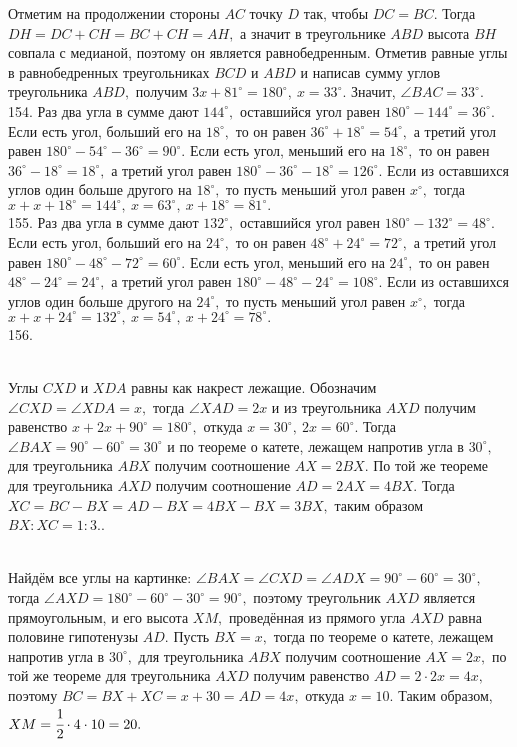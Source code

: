 Отметим на продолжении стороны $AC$ точку $D$ так, чтобы $DC=BC.$ Тогда $DH=DC+CH=BC+CH=AH,$ а значит в треугольнике $ABD$ высота $BH$ совпала с медианой, поэтому он является равнобедренным. Отметив равные углы в равнобедренных треугольниках $BCD$ и $ABD$ и написав сумму углов треугольника $ABD,$ получим $3x+81^\circ=180^\circ,\ x=33^\circ.$ Значит, $\angle BAC=33^\circ.$\\
154. Раз два угла в сумме дают $144^\circ,$ оставшийся угол равен $180^\circ-144^\circ=36^\circ.$ Если есть угол, больший его на $18^\circ,$ то он равен $36^\circ+18^\circ=54^\circ,$ а третий угол равен $180^\circ-54^\circ-36^\circ=90^\circ.$ Если есть угол, меньший его на $18^\circ,$ то он равен $36^\circ-18^\circ=18^\circ,$ а третий угол равен
$180^\circ-36^\circ-18^\circ=126^\circ.$ Если из оставшихся углов один больше другого на $18^\circ,$ то пусть меньший угол равен $x^\circ,$ тогда
$x+x+18^\circ=144^\circ,\ x=63^\circ,\ x+18^\circ=81^\circ.$\\
155. Раз два угла в сумме дают $132^\circ,$ оставшийся угол равен $180^\circ-132^\circ=48^\circ.$ Если есть угол, больший его на $24^\circ,$ то он равен $48^\circ+24^\circ=72^\circ,$ а третий угол равен $180^\circ-48^\circ-72^\circ=60^\circ.$ Если есть угол, меньший его на $24^\circ,$ то он равен $48^\circ-24^\circ=24^\circ,$ а третий угол равен
$180^\circ-48^\circ-24^\circ=108^\circ.$ Если из оставшихся углов один больше другого на $24^\circ,$ то пусть меньший угол равен $x^\circ,$ тогда
$x+x+24^\circ=132^\circ,\ x=54^\circ,\ x+24^\circ=78^\circ.$\\
156. \begin{figure}[ht!]
\end{figure}\\
Углы $CXD$ и $XDA$ равны как накрест лежащие. Обозначим $\angle CXD=\angle XDA=x,$ тогда $\angle XAD=2x$ и из треугольника $AXD$ получим равенство $x+2x+90^\circ=180^\circ,$ откуда $x=30^\circ,\ 2x=60^\circ.$ Тогда $\angle BAX=90^\circ-60^\circ=30^\circ$ и по теореме о катете, лежащем напротив угла в $30^\circ,$ для треугольника $ABX$ получим соотношение $AX=2BX.$ По той же теореме для треугольника $AXD$ получим соотношение $AD=2AX=4BX.$ Тогда $XC=BC-BX=AD-BX=4BX-BX=3BX,$ таким образом $BX:XC=1:3.$\newpage{}. \begin{figure}[ht!]
\end{figure}\\
Найдём все углы на картинке: $\angle BAX=\angle CXD=\angle ADX=90^\circ-60^\circ=30^\circ,$ тогда $\angle AXD=180^\circ-60^\circ-30^\circ=90^\circ,$ поэтому треугольник $AXD$ является прямоугольным, и его высота $XM,$ проведённая из прямого угла $AXD$ равна половине гипотенузы $AD.$ Пусть $BX=x,$ тогда по теореме о катете, лежащем напротив угла в $30^\circ,$ для треугольника $ABX$ получим соотношение $AX=2x,$ по той же теореме для треугольника $AXD$ получим равенство $AD=2\cdot2x=4x,$ поэтому $BC=BX+XC=x+30=AD=4x,$ откуда $x=10.$ Таким образом, $XM=\cfrac{1}{2}\cdot4\cdot10=20.$\\
